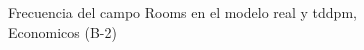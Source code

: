 \begin{figure}[H]
    \centering
    
    \caption{Frecuencia del campo Rooms en el modelo real y tddpm, Economicos (B-2)}
    \label{frecuency-Rooms-tddpm_mlp}
\end{figure}
